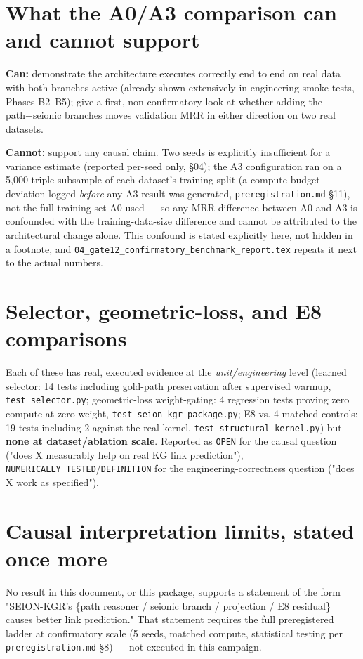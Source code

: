 \documentclass[11pt]{article}
\begin{document}
\section{What the A0/A3 comparison can and cannot support}
\textbf{Can:} demonstrate the architecture executes correctly end to end on real data with both
branches active (already shown extensively in engineering smoke tests, Phases B2--B5); give a
first, non-confirmatory look at whether adding the path+seionic branches moves validation MRR in
either direction on two real datasets.

\textbf{Cannot:} support any causal claim. Two seeds is explicitly insufficient for a variance
estimate (reported per-seed only, \S04); the A3 configuration ran on a 5,000-triple subsample of
each dataset's training split (a compute-budget deviation logged \emph{before} any A3 result was
generated, \texttt{preregistration.md} \S11), not the full training set A0 used --- so any MRR
difference between A0 and A3 is confounded with the training-data-size difference and cannot be
attributed to the architectural change alone. This confound is stated explicitly here, not hidden
in a footnote, and \texttt{04\_gate12\_confirmatory\_benchmark\_report.tex} repeats it next to the
actual numbers.

\section{Selector, geometric-loss, and E8 comparisons}
Each of these has real, executed evidence at the \emph{unit/engineering} level (learned selector:
14 tests including gold-path preservation after supervised warmup, \texttt{test\_selector.py};
geometric-loss weight-gating: 4 regression tests proving zero compute at zero weight,
\texttt{test\_seion\_kgr\_package.py}; E8 vs. 4 matched controls: 19 tests including 2 against the
real kernel, \texttt{test\_structural\_kernel.py}) but \textbf{none at dataset/ablation scale}.
Reported as \texttt{OPEN} for the causal question ("does X measurably help on real KG link
prediction"), \texttt{NUMERICALLY\_TESTED}/\texttt{DEFINITION} for the engineering-correctness
question ("does X work as specified").

\section{Causal interpretation limits, stated once more}
No result in this document, or this package, supports a statement of the form "SEION-KGR's
\{path reasoner / seionic branch / projection / E8 residual\} causes better link prediction." That
statement requires the full preregistered ladder at confirmatory scale (5 seeds, matched compute,
statistical testing per \texttt{preregistration.md} \S8) --- not executed in this campaign.
\end{document}
